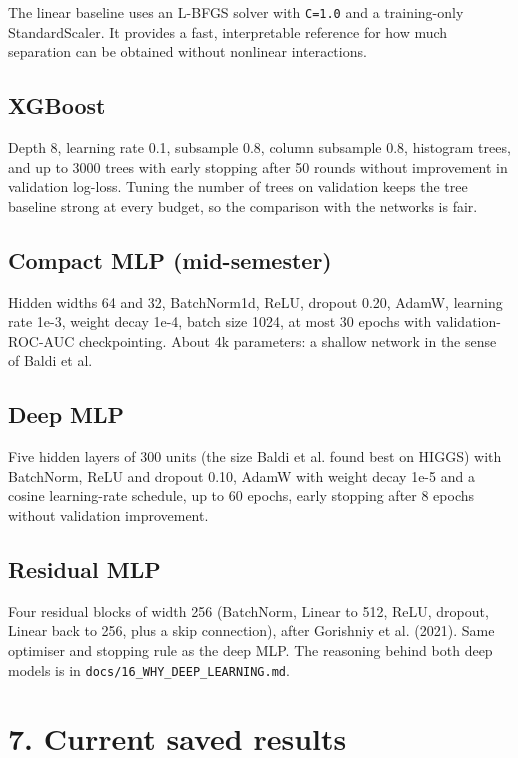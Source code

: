 \documentclass[11pt,a4paper,oneside]{report}
\begin{document}
The linear baseline uses an L-BFGS solver with \texttt{C=1.0} and a training-only StandardScaler. It provides a fast, interpretable reference for how much separation can be obtained without nonlinear interactions.

\subsection{XGBoost}

Depth 8, learning rate 0.1, subsample 0.8, column subsample 0.8, histogram trees, and up to 3000 trees with early stopping after 50 rounds without improvement in validation log-loss. Tuning the number of trees on validation keeps the tree baseline strong at every budget, so the comparison with the networks is fair.

\subsection{Compact MLP (mid-semester)}

Hidden widths 64 and 32, BatchNorm1d, ReLU, dropout 0.20, AdamW, learning rate 1e-3, weight decay 1e-4, batch size 1024, at most 30 epochs with validation-ROC-AUC checkpointing. About 4k parameters: a shallow network in the sense of Baldi et al.

\subsection{Deep MLP}

Five hidden layers of 300 units (the size Baldi et al. found best on HIGGS) with BatchNorm, ReLU and dropout 0.10, AdamW with weight decay 1e-5 and a cosine learning-rate schedule, up to 60 epochs, early stopping after 8 epochs without validation improvement.

\subsection{Residual MLP}

Four residual blocks of width 256 (BatchNorm, Linear to 512, ReLU, dropout, Linear back to 256, plus a skip connection), after Gorishniy et al. (2021). Same optimiser and stopping rule as the deep MLP. The reasoning behind both deep models is in \texttt{docs/16\_WHY\_DEEP\_LEARNING.md}.

\section{7. Current saved results}
\end{document}

